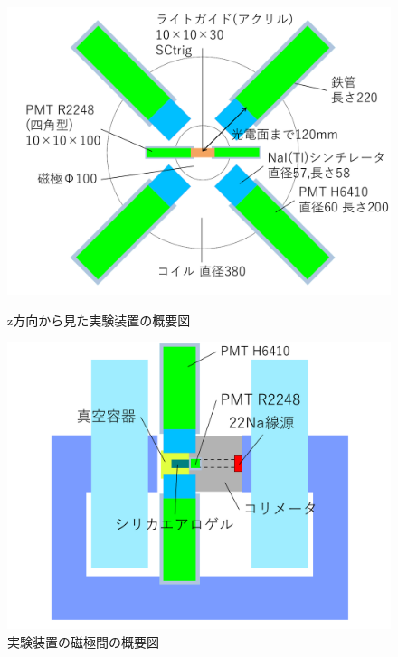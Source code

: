 \begin{figure}[H]
\begin{minipage}{0.5\hsize}
\centering
\includegraphics[keepaspectratio,scale=0.3]{fig/ybm/device2.pdf}
\caption{z方向から見た実験装置の概要図}
\label{fig:device2}
\end{minipage}
\begin{minipage}{0.5\hsize}
\centering
\includegraphics[keepaspectratio,scale=0.3]{fig/ybm/device3.pdf}
\caption{実験装置の磁極間の概要図}
\label{fig:device3}
\end{minipage}
\end{figure}

